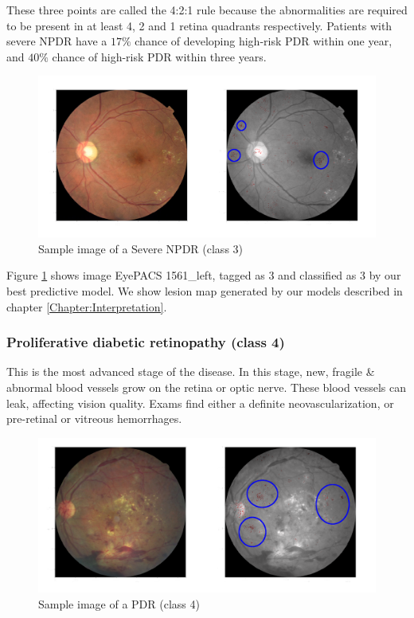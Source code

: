 These three points are called the 4:2:1 rule because the abnormalities are required to be present in at least 4, 2 and 1 retina quadrants respectively. Patients with severe NPDR have a $17 \%$ chance of developing high-risk PDR within one year, and $40\%$ chance of high-risk PDR within three years.

\begin{figure}[ht!]
	\centering
	\includegraphics[width=\textwidth]{Figures/chapter_background/classes/class3.png}
	\caption{Sample image of a Severe NPDR (class 3)} 
	\label{back:fig:class3_sample} 
\end{figure}

Figure \ref{back:fig:class3_sample} shows image EyePACS 1561\_left, tagged as 3 and classified as 3 by our best predictive model. We show lesion map generated by our models described in chapter \ref{Chapter:Interpretation}.


\subsubsection*{Proliferative diabetic retinopathy (class 4)}

This is the most advanced stage of the disease. In this stage, new, fragile \& abnormal blood vessels grow on the retina or optic nerve. These blood vessels can leak, affecting vision quality. Exams find either a definite neovascularization, or pre-retinal or vitreous hemorrhages. 

\begin{figure}[ht!]
	\centering
	\includegraphics[width=\textwidth]{Figures/chapter_background/classes/class4.png}
	\caption{Sample image of a PDR (class 4)} 
	\label{back:fig:class4_sample} 
\end{figure}

